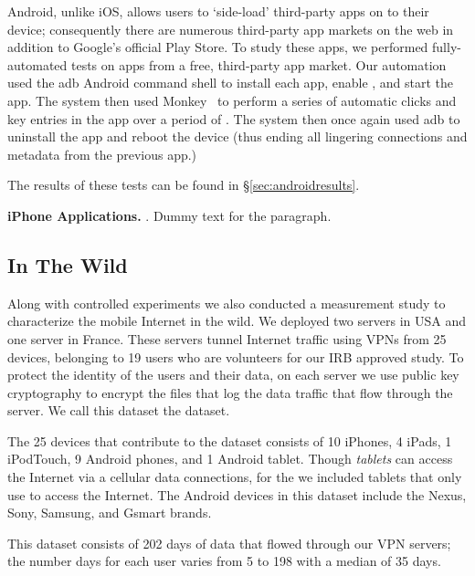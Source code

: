   Android, unlike iOS, allows users to `side-load' third-party apps on to their device; consequently there are numerous third-party app markets on the web in addition to Google's official Play Store.
  To study these apps, we performed fully-automated tests on  apps from a free, third-party app market.
  Our automation used the adb Android command shell to install each app, enable \platname, and start the app.
  The system then used Monkey~\cite{} to perform a series of automatic clicks and key entries in the app over a period of .
  The system then once again used adb to uninstall the app and reboot the device (thus ending all lingering connections and metadata from the previous app.)

  The results of these tests can be found in \S\ref{sec:androidresults}.

  {\bf iPhone Applications.}
. 
Dummy text for the paragraph.

\subsection{In The Wild}

Along with controlled experiments we also conducted a measurement study to characterize the mobile Internet in the wild.
We deployed two \platname servers in USA and one server in France. 
These servers tunnel Internet traffic using VPNs from 25 devices, belonging to 19 users who are volunteers for our IRB approved study.
To protect the identity of the users and their data, on each server we use public key cryptography to encrypt the files that log the data traffic that flow through the server. 
We call this dataset the \moball dataset. 

The 25 devices that contribute to the \moball dataset consists of 10 iPhones, 4 iPads, 1 iPodTouch, 9 Android phones, and 1 Android tablet.
Though \emph{tablets} can access the Internet via a cellular data connections, for the \moball we included tablets that only use \wifi to access the Internet.
The Android devices in this dataset include the Nexus, Sony, Samsung, and Gsmart brands.

This dataset consists of 202 days of data that flowed through our VPN servers; the number days for each user varies from 5 to 198 with a median of 35 days.


